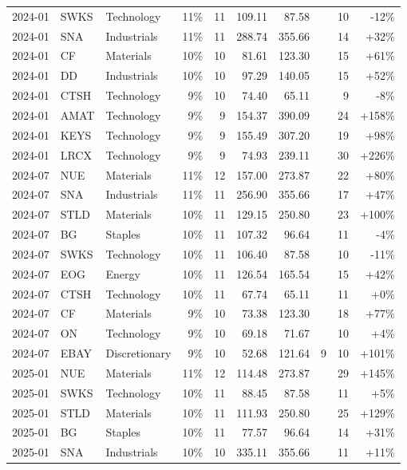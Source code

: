 \documentclass[11pt,a4paper]{article}
\begin{document}
{\begin{longtable}{l l l r r r r r r r}
2024-01 & SWKS & Technology & 11\% & 11 & 109.11 & 87.58 &  & 10 & -12\% \\
2024-01 & SNA & Industrials & 11\% & 11 & 288.74 & 355.66 &  & 14 & +32\% \\
2024-01 & CF & Materials & 10\% & 10 & 81.61 & 123.30 &  & 15 & +61\% \\
2024-01 & DD & Industrials & 10\% & 10 & 97.29 & 140.05 &  & 15 & +52\% \\
2024-01 & CTSH & Technology & 9\% & 10 & 74.40 & 65.11 &  & 9 & -8\% \\
2024-01 & AMAT & Technology & 9\% & 9 & 154.37 & 390.09 &  & 24 & +158\% \\
2024-01 & KEYS & Technology & 9\% & 9 & 155.49 & 307.20 &  & 19 & +98\% \\
2024-01 & LRCX & Technology & 9\% & 9 & 74.93 & 239.11 &  & 30 & +226\% \\
2024-07 & NUE & Materials & 11\% & 12 & 157.00 & 273.87 &  & 22 & +80\% \\
2024-07 & SNA & Industrials & 11\% & 11 & 256.90 & 355.66 &  & 17 & +47\% \\
2024-07 & STLD & Materials & 10\% & 11 & 129.15 & 250.80 &  & 23 & +100\% \\
2024-07 & BG & Staples & 10\% & 11 & 107.32 & 96.64 &  & 11 & -4\% \\
2024-07 & SWKS & Technology & 10\% & 11 & 106.40 & 87.58 &  & 10 & -11\% \\
2024-07 & EOG & Energy & 10\% & 11 & 126.54 & 165.54 &  & 15 & +42\% \\
2024-07 & CTSH & Technology & 10\% & 11 & 67.74 & 65.11 &  & 11 & +0\% \\
2024-07 & CF & Materials & 9\% & 10 & 73.38 & 123.30 &  & 18 & +77\% \\
2024-07 & ON & Technology & 9\% & 10 & 69.18 & 71.67 &  & 10 & +4\% \\
2024-07 & EBAY & Discretionary & 9\% & 10 & 52.68 & 121.64 & 9 & 10 & +101\% \\
2025-01 & NUE & Materials & 11\% & 12 & 114.48 & 273.87 &  & 29 & +145\% \\
2025-01 & SWKS & Technology & 10\% & 11 & 88.45 & 87.58 &  & 11 & +5\% \\
2025-01 & STLD & Materials & 10\% & 11 & 111.93 & 250.80 &  & 25 & +129\% \\
2025-01 & BG & Staples & 10\% & 11 & 77.57 & 96.64 &  & 14 & +31\% \\
2025-01 & SNA & Industrials & 10\% & 10 & 335.11 & 355.66 &  & 11 & +11\% \\

\end{longtable}}
\end{document}
